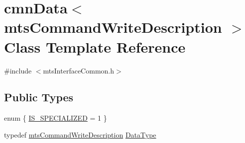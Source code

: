 \hypertarget{classcmn_data_3_01mts_command_write_description_01_4}{\section{cmn\-Data$<$ mts\-Command\-Write\-Description $>$ Class Template Reference}
\label{classcmn_data_3_01mts_command_write_description_01_4}
}


{\ttfamily \#include $<$mts\-Interface\-Common.\-h$>$}

\subsection*{Public Types}
\begin{DoxyCompactItemize}
\item 
enum \{ \hyperlink{classcmn_data_3_01mts_command_write_description_01_4_a725d2f70629252fd559aaf3717bf6e8bae2caea2590f7eb75e8bedba06a609904}{I\-S\-\_\-\-S\-P\-E\-C\-I\-A\-L\-I\-Z\-E\-D} = 1
 \}
\item 
typedef \hyperlink{classmts_command_write_description}{mts\-Command\-Write\-Description} \hyperlink{classcmn_data_3_01mts_command_write_description_01_4_aed29f1a95e5884bf865916b40933e824}{Data\-Type}
\end{DoxyCompactItemize}
